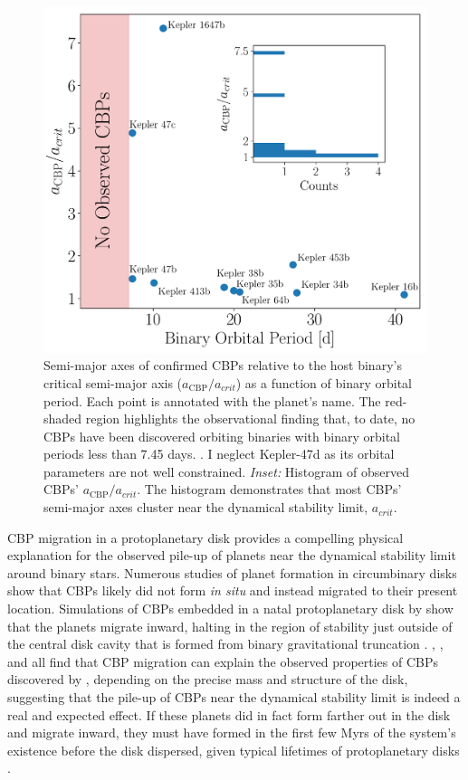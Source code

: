 \begin{figure}[]
	\includegraphics[width=\columnwidth]{observed_acrit.pdf}
    \caption{Semi-major axes of confirmed \kepler CBPs relative to the host binary's critical semi-major axis ($a_{\text{CBP}}/a_{crit}$) as a function of binary orbital period. Each point is annotated with the planet's name.  The red-shaded region highlights the observational finding that, to date, no CBPs have been discovered orbiting binaries with binary orbital periods less than 7.45 days. \citep{Welsh2014,Winn2015}.  I neglect Kepler-47d as its orbital parameters are not well constrained. {\it Inset:} Histogram of observed \kepler CBPs' $a_{\text{CBP}}/a_{crit}$.  The histogram demonstrates that most CBPs' semi-major axes cluster near the dynamical stability limit, $a_{crit}$.}
    \label{STEEP:fig:observed_acrit}
\end{figure}

CBP migration in a protoplanetary disk provides a compelling physical explanation for the observed pile-up of planets near the dynamical stability limit around binary stars.  Numerous studies of planet formation in circumbinary disks show that CBPs likely did not form {\it in situ} \citep[e.g.][]{Paardekooper2012,Meschiari2012a,Meschiari2012b,Pelupessy2013} and instead migrated to their present location.  Simulations of CBPs embedded in a natal protoplanetary disk by \citet{Pierens2007} show that the planets migrate inward, halting in the region of stability just outside of the central disk cavity that is formed from binary gravitational truncation \citep{Artymowicz1994}.  \citet{Dunhill2013}, \citet{Pierens2013}, and \citet{Kley2014} all find that CBP migration can explain the observed properties of CBPs discovered by \kepler, depending on the precise mass and structure of the disk, suggesting that the pile-up of CBPs near the dynamical stability limit is indeed a real and expected effect.  If these planets did in fact form farther out in the disk and migrate inward, they must have formed in the first few Myrs of the system's existence before the disk dispersed, given typical lifetimes of protoplanetary disks \citep[e.g.][]{Haisch2001}.

